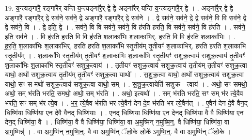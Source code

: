 \documentclass[17pt]{extarticle}
\begin{document}
19. य॒न्त्यङ्गा॑रै॒ रङ्गा॑रैर् यन्ति य॒न्त्यङ्गा॑रै॒र् द्वे द्वे अङ्गा॑रैर् यन्ति य॒न्त्यङ्गा॑रै॒र् द्वे । . अङ्गा॑रै॒र् द्वे द्वे अङ्गा॑रै॒ रङ्गा॑रै॒र् द्वे सव॑ने॒ सव॑ने॒ द्वे अङ्गा॑रै॒ रङ्गा॑रै॒र् द्वे सव॑ने । . द्वे सव॑ने॒ सव॑ने॒ द्वे द्वे सव॑ने॒ वि वि सव॑ने॒ द्वे द्वे सव॑ने॒ वि । . द्वे इति॒ द्वे । . सव॑ने॒ वि वि सव॑ने॒ सव॑ने॒ वि ह॑रति हरति॒ वि सव॑ने॒ सव॑ने॒ वि ह॑रति । . सव॑ने॒ इति॒ सव॑ने । . वि ह॑रति हरति॒ वि वि ह॑रति श॒लाका॑भिः श॒लाका॑भिर्. हरति॒ वि वि ह॑रति श॒लाका॑भिः । . ह॒र॒ति॒ श॒लाका॑भिः श॒लाका॑भिर्. हरति हरति श॒लाका॑भि स्तृ॒तीय॑म् तृ॒तीयꣳ॑ श॒लाका॑भिर्. हरति हरति श॒लाका॑भि स्तृ॒तीय᳚म् । . श॒लाका॑भि स्तृ॒तीय॑म् तृ॒तीयꣳ॑ श॒लाका॑भिः श॒लाका॑भि स्तृ॒तीयꣳ॑ सशुक्र॒त्वाय॑ सशुक्र॒त्वाय॑ तृ॒तीयꣳ॑ श॒लाका॑भिः श॒लाका॑भि स्तृ॒तीयꣳ॑ सशुक्र॒त्वाय॑ । . तृ॒तीयꣳ॑ सशुक्र॒त्वाय॑ सशुक्र॒त्वाय॑ तृ॒तीय॑म् तृ॒तीयꣳ॑ सशुक्र॒त्वा याथो॒ अथो॑ सशुक्र॒त्वाय॑ तृ॒तीय॑म् तृ॒तीयꣳ॑ सशुक्र॒त्वा याथो᳚ । . स॒शु॒क्र॒त्वा याथो॒ अथो॑ सशुक्र॒त्वाय॑ सशुक्र॒त्वा याथो॒ सꣳ स मथो॑ सशुक्र॒त्वाय॑ सशुक्र॒त्वा याथो॒ सम् । . स॒शु॒क्र॒त्वायेति॑ सशुक्र - त्वाय॑ । . अथो॒ सꣳ समथो॒ अथो॒ सम् भ॑रति भरति॒ समथो॒ अथो॒ सम् भ॑रति । . अथो॒ इत्यथो᳚ । . सम् भ॑रति भरति॒ सꣳ सम् भ॑र त्ये॒वैव भ॑रति॒ सꣳ सम् भ॑र त्ये॒व । . भ॒र॒ त्ये॒वैव भ॑रति भर त्ये॒वैन॑ देन दे॒व भ॑रति भर त्ये॒वैन॑त् । . ए॒वैन॑ देन दे॒वै वैन॒द् धिष्णि॑या॒ धिष्णि॑या एन दे॒वै वैन॒द् धिष्णि॑याः । . ए॒न॒द् धिष्णि॑या॒ धिष्णि॑या एन देन॒द् धिष्णि॑या॒ वै वै धिष्णि॑या एन देन॒द् धिष्णि॑या॒ वै । . धिष्णि॑या॒ वै वै धिष्णि॑या॒ धिष्णि॑या॒ वा अ॒मुष्मि॑न् न॒मुष्मि॒न्॒. वै धिष्णि॑या॒ धिष्णि॑या॒ वा अ॒मुष्मिन्न्॑ । . वा अ॒मुष्मि॑न् न॒मुष्मि॒न्॒. वै वा अ॒मुष्मि॑न् ॅलो॒के लो॒के॑ ऽमुष्मि॒न्॒. वै वा अ॒मुष्मि॑न् ॅलो॒के । \newline
\end{document}
